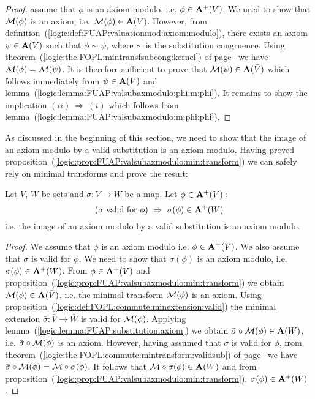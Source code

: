 \begin{proof}
assume that $\phi$ is an axiom modulo, i.e. $\phi\in\mbox{${\bf A}^{+}(V)$}$. We need
to show that ${\cal M}(\phi)$ is an axiom, i.e. ${\cal
M}(\phi)\in{\bf A}(\bar{V})$. However, from
definition~(\ref{logic:def:FUAP:valuationmod:axiom:modulo}), there
exists an axiom $\psi\in\mbox{${\bf A}(V)$}$ such that $\phi\sim\psi$, where $\sim$
is the substitution congruence. Using
theorem~(\ref{logic:the:FOPL:mintransfsubcong:kernel}) of
page~\pageref{logic:the:FOPL:mintransfsubcong:kernel} we have ${\cal
M}(\phi)={\cal M}(\psi)$. It is therefore sufficient to prove that
${\cal M}(\psi)\in{\bf A}(\bar{V})$ which follows immediately from
$\psi\in\mbox{${\bf A}(V)$}$ and
lemma~(\ref{logic:lemma:FUAP:valsubaxmodulo:phi:m:phi}). It remains
to show the implication $(ii)\ \Rightarrow\ (i)$ which follows from
lemma~(\ref{logic:lemma:FUAP:valsubaxmodulo:m:phi:phi}).
\end{proof}

As discussed in the beginning of this section, we need to show that
the image of an axiom modulo by a valid substitution is an axiom
modulo. Having proved
proposition~(\ref{logic:prop:FUAP:valsubaxmodulo:min:transform}) we
can safely rely on minimal transforms and prove the result:

\begin{prop}\label{logic:prop:FUAP:valsubaxmodulo:axiom:modulo}
Let $V$, $W$ be sets and $\sigma:V\to W$ be a map. Let
$\phi\in\mbox{${\bf A}^{+}(V)$}$\,:
    \[
    (\mbox{$\sigma$ valid for $\phi$})\ \Rightarrow\
    \sigma(\phi)\in{\bf A}^{+}(W)
    \]
i.e. the image of an axiom modulo by a valid substitution is an
axiom modulo.
\end{prop}
\begin{proof}
We assume that $\phi$ is an axiom modulo i.e. $\phi\in\mbox{${\bf A}^{+}(V)$}$. We also
assume that $\sigma$ is valid for $\phi$. We need to show that
$\sigma(\phi)$ is an axiom modulo, i.e. $\sigma(\phi)\in{\bf
A}^{+}(W)$. From $\phi\in\mbox{${\bf A}^{+}(V)$}$ and
proposition~(\ref{logic:prop:FUAP:valsubaxmodulo:min:transform}) we
obtain ${\cal M}(\phi)\in{\bf A}(\bar{V})$, i.e. the minimal
transform ${\cal M}(\phi)$ is an axiom. Using
proposition~(\ref{logic:def:FOPL:commute:minextension:valid}) the
minimal extension ${\bar \sigma}:\bar{V}\to\bar{W}$ is valid for
${\cal M}(\phi)$. Applying
lemma~(\ref{logic:lemma:FUAP:substitution:axiom}) we obtain
$\bar{\sigma}\circ{\cal M}(\phi)\in{\bf A}(\bar{W})$, i.e.
$\bar{\sigma}\circ{\cal M}(\phi)$ is an axiom. However, having
assumed that $\sigma$ is valid for $\phi$, from
theorem~(\ref{logic:the:FOPL:commute:mintransform:validsub}) of
page~\pageref{logic:the:FOPL:commute:mintransform:validsub} we have
$\bar{\sigma}\circ{\cal M}(\phi)={\cal M}\circ\sigma(\phi)$. It
follows that ${\cal M}\circ\sigma(\phi)\in{\bf A}(\bar{W})$ and from
proposition~(\ref{logic:prop:FUAP:valsubaxmodulo:min:transform}),
$\sigma(\phi)\in{\bf A}^{+}(W)$.
\end{proof}

